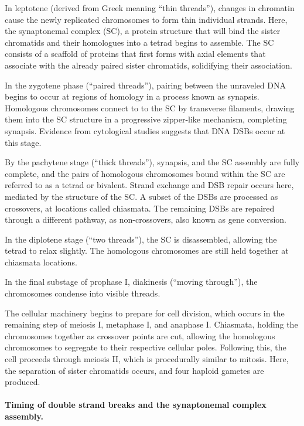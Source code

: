 In leptotene (derived from Greek meaning ``thin threads''), changes in chromatin cause the newly replicated chromosomes to form thin individual strands.
Here, the synaptonemal complex (SC), a protein structure that will bind the sister chromatids and their homologues into a tetrad begins to assemble.
The SC consists of a scaffold of proteins that first forms with axial elements that associate with the already paired sister chromatids, solidifying their association.

In the zygotene phase (``paired threads''), pairing between the unraveled DNA begins to occur at regions of homology in a process known as synapsis.
Homologous chromosomes connect to to the SC by transverse filaments, drawing them into the SC structure in a progressive zipper-like mechanism, completing synapsis\cite{Yang2009}.
Evidence from cytological studies suggests that DNA DSBs occur at this stage\cite{Oliver-Bonet2005,Gruhn2013}.

By the pachytene stage (``thick threads''), synapsis, and the SC assembly are fully complete, and the pairs of homologous chromosomes bound within the SC are referred to as a tetrad or bivalent.
Strand exchange and DSB repair occurs here, mediated by the structure of the SC.
A subset of the DSBs are processed as crossovers, at locations called chiasmata.
The remaining DSBs are repaired through a different pathway, as non-crossovers, also known as gene conversion.

In the diplotene stage (``two threads''), the SC is disassembled, allowing the tetrad to relax slightly.
The homologous chromosomes are still held together at chiasmata locations.

In the final substage of prophase I, diakinesis (``moving through''), the chromosomes condense into visible threads.

The cellular machinery begins to prepare for cell division, which occurs in the remaining step of meiosis I, metaphase I, and anaphase I.
Chiasmata, holding the chromosomes together as crossover points are cut, allowing the homologous chromosomes to segregate to their respective cellular poles.  
Following this, the cell proceeds through meiosis II, which is procedurally similar to mitosis.
Here, the separation of sister chromatids occurs, and four haploid gametes are produced.



\paragraph{Timing of double strand breaks and the synaptonemal complex assembly.}

